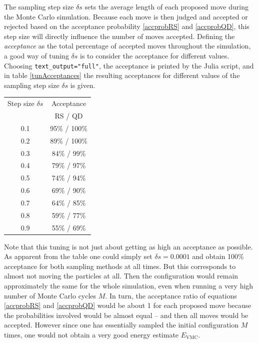 \documentclass[a4paper,8pt]{article}
\begin{document}
\begin{multicols}{2}
The sampling step size $\delta s$ sets the average length of each proposed move during the Monte Carlo simulation. Because each move is then judged and accepted or rejected based on the acceptance probability \eqref{accprobRS} and \eqref{accprobQD}, this step size will directly influence the number of moves accepted. Defining the \textit{acceptance} as the total percentage of accepted moves throughout the simulation, a good way of tuning $\delta s$ is to consider the acceptance for different values. Choosing \texttt{text\_output="full"}, the acceptance is printed by the Julia script, and in table \ref{tunAcceptances} the resulting acceptances for different values of the sampling step size $\delta s$ is given.

\begin{center}\small
{}
\label{tunAcceptances}
\begin{tabular}{cc}
	\hline\hline
	Step size $\delta s$ & Acceptance \\
	 & RS / QD\\
	\hline
    0.1 & 95\% / 100\%\\
    0.2 & 89\% / 100\%\\
    0.3 & 84\% / 99\%\\
    0.4 & 79\% / 97\%\\
    0.5 & 74\% / 94\%\\
    0.6 & 69\% / 90\%\\
    0.7 & 64\% / 85\%\\
    0.8 & 59\% / 77\%\\
    0.9 & 55\% / 69\%\\
    \hline\hline
\end{tabular}
\end{center}

Note that this tuning is not just about getting as high an acceptance as possible. As apparent from the table one could simply set ${\delta s = 0.0001}$ and obtain 100\% acceptance for both sampling methods at all times. But this corresponds to almost not moving the particles at all. Then the configuration would remain approximately the same for the whole simulation, even when running a very high number of Monte Carlo cycles $M$. In turn, the acceptance ratio of equations \eqref{accprobRS} and \eqref{accprobQD} would be about 1 for each proposed move because the probabilities involved would be almost equal -- and then  all moves would be accepted. However since one has essentially sampled the initial configuration $M$ times, one would not obtain a very good energy estimate $E_\text{VMC}$.


\end{multicols}
\end{document}
